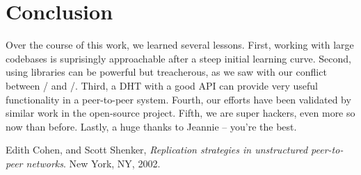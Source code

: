 \documentclass[11pt,twocolumn]{article}
\begin{document}
\section{Conclusion}
Over the course of this work, we learned several lessons.
First, working with large codebases is suprisingly approachable after a steep initial learning curve.
Second, using libraries can be powerful but treacherous, as we saw with our conflict between \Entangled/ and \Tornado/.
Third, a DHT with a good API can provide very useful functionality in a peer-to-peer system.
Fourth, our efforts have been validated by similar work in the open-source project.
Fifth, we are super hackers, even more so now than before.
Lastly, a huge thanks to Jeannie -- you're the best.

\begin{thebibliography}{9}
  Edith Cohen, and Scott Shenker,
  \emph{Replication strategies in unstructured peer-to-peer networks}.
  New York, NY,
  2002.
\end{thebibliography}
\end{document}
